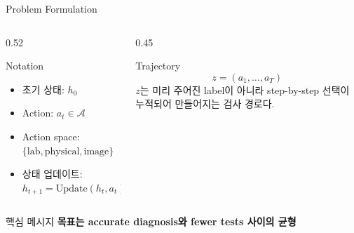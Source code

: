 \documentclass[11pt,notheorems,hyperref={pdfauthor=whatever}]{beamer}
\begin{document}
\begin{frame}[t]{Problem Formulation}
\small
\begin{columns}[T,onlytextwidth]
\begin{column}{0.52\textwidth}
\begin{block}{Notation}
\begin{itemize}
  \item 초기 상태: \(h_0\)
  \item Action: \(a_t \in \mathcal{A}\)
  \item Action space: \(\{\mathrm{lab},\mathrm{physical},\mathrm{image}\}\)
  \item 상태 업데이트: \(h_{t+1}=\mathrm{Update}(h_t,a_t)\)
\end{itemize}
\end{block}
\end{column}
\begin{column}{0.45\textwidth}
\begin{block}{Trajectory}
\[
z=(a_1,\dots,a_T)
\]
\footnotesize \(z\)는 미리 주어진 label이 아니라 step-by-step 선택이 누적되어 만들어지는 검사 경로다.
\end{block}
\end{column}
\end{columns}
\vspace{0.5em}
\begin{block}{핵심 메시지}
\centering\Large\bfseries
목표는 accurate diagnosis와 fewer tests 사이의 균형
\end{block}
\end{frame}
\end{document}
